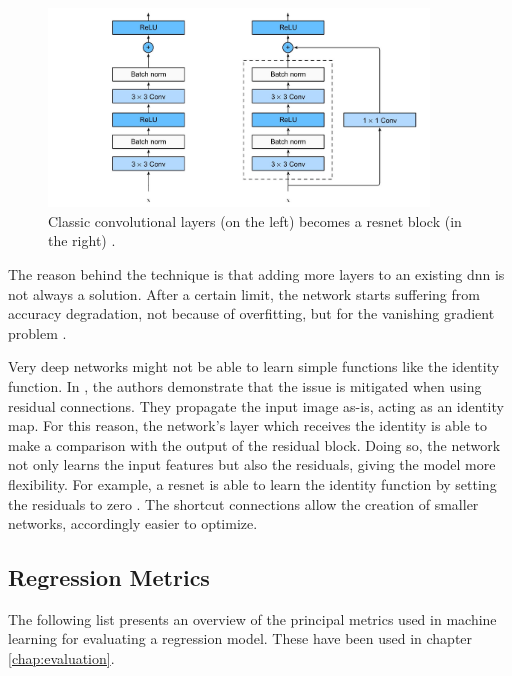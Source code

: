 \begin{figure}[!h]
	\centering
	\includegraphics[width=0.9\textwidth]{"contents/images/02-resnet-blocks"}
	\caption[\gls{resnet} formation]{Classic convolutional layers (on the left) becomes a \gls{resnet} block (in the right) \cite{resnet_1}.}
	\label{fig:resnet-blocks}
\end{figure}

The reason behind the technique is that adding more layers to an existing \gls{dnn} is not always a solution. After a certain limit, the network starts suffering from accuracy degradation, not because of overfitting, but for the vanishing gradient problem \cite{hochreiter1998vanishing}. 

Very deep networks might not be able to learn simple functions like the identity function. In \cite{he2015deep}, the authors demonstrate that the issue is mitigated when using residual connections. They propagate the input image as-is, acting as an identity map. For this reason, the network's layer which receives the identity is able to make a comparison with the output of the residual block. Doing so, the network not only learns the input features but also the residuals, giving the model more flexibility. For example, a \gls{resnet} is able to learn the identity function by setting the residuals to zero \cite{resnet_2}. The shortcut connections allow the creation of smaller networks, accordingly easier to optimize.



\subsection{Regression Metrics}
\label{subsec:metrics}

The following list presents an overview of the principal metrics used in machine learning for evaluating a regression model. These have been used in chapter \ref{chap:evaluation}.

